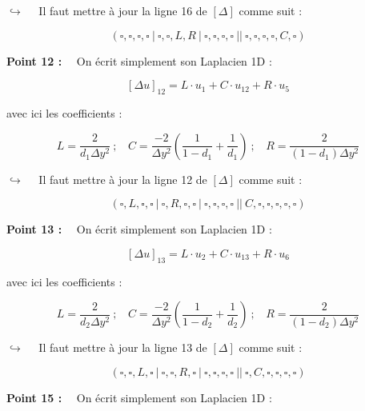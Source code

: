 \documentclass[12pt]{article}
\begin{document}
\vspace{5 mm}

$\hookrightarrow$~~ Il faut mettre à jour la ligne 16 de $[\Delta]$ comme suit :

$$(\square,\square,\square,\square~|~\square,\square,L,R~|~\square,\square,\square,\square~||~\square,\square,\square,\square,C,\square)$$

\vspace{5 mm}

\noindent
\textbf{Point 12 :}~~ On écrit simplement son Laplacien 1D :

$$[\Delta u]_{12} = L \cdot u_{1} + C \cdot u_{12} + R \cdot u_{5}$$

\vspace{5 mm}
\noindent
avec ici les coefficients :

$$L = \frac{2}{d_1 \Delta y^2}~;~~~~ C = \frac{-2}{\Delta y^2} \left( \frac{1}{1-d_1} + \frac{1}{d_1} \right)~;~~~~ R = \frac{2}{(1-d_1) \Delta y^2}$$

\vspace{5 mm}

$\hookrightarrow$~~ Il faut mettre à jour la ligne 12 de $[\Delta]$ comme suit :

$$(\square,L,\square,\square~|~\square,R,\square,\square~|~\square,\square,\square,\square~||~C,\square,\square,\square,\square,\square)$$

\vspace{5 mm}

\noindent
\textbf{Point 13 :}~~ On écrit simplement son Laplacien 1D :

$$[\Delta u]_{13} = L \cdot u_{2} + C \cdot u_{13} + R \cdot u_{6}$$

\vspace{5 mm}
\noindent
avec ici les coefficients :

$$L = \frac{2}{d_2 \Delta y^2}~;~~~~ C = \frac{-2}{\Delta y^2} \left( \frac{1}{1-d_2} + \frac{1}{d_2} \right)~;~~~~ R = \frac{2}{(1-d_2) \Delta y^2}$$

\vspace{5 mm}

$\hookrightarrow$~~ Il faut mettre à jour la ligne 13 de $[\Delta]$ comme suit :

$$(\square,\square,L,\square~|~\square,\square,R,\square~|~\square,\square,\square,\square~||~\square,C,\square,\square,\square,\square)$$

\vspace{5 mm}

\noindent
\textbf{Point 15 :}~~ On écrit simplement son Laplacien 1D :
\end{document}

